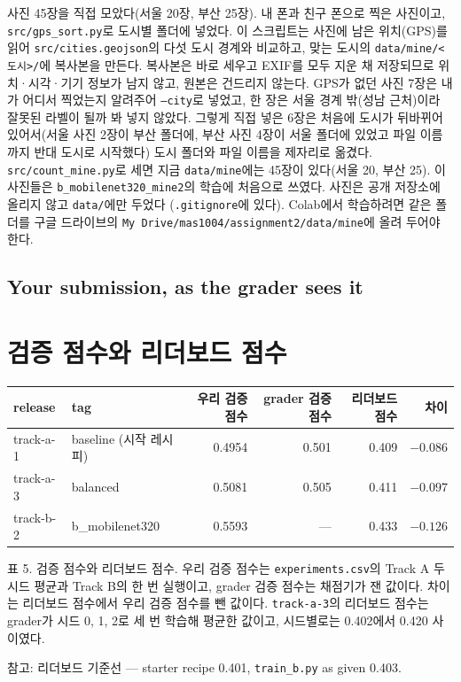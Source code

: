 \documentclass[11pt]{article}
\begin{document}
사진 45장을 직접 모았다(서울 20장, 부산 25장). 내 폰과 친구 폰으로 찍은 사진이고,
\texttt{src/gps\_sort.py}로 도시별 폴더에 넣었다. 이 스크립트는 사진에 남은 위치(GPS)를
읽어 \texttt{src/cities.geojson}의 다섯 도시 경계와 비교하고, 맞는 도시의
\texttt{data/mine/<도시>/}에 복사본을 만든다. 복사본은 바로 세우고 EXIF를 모두 지운 채
저장되므로 위치·시각·기기 정보가 남지 않고, 원본은 건드리지 않는다. GPS가 없던 사진
7장은 내가 어디서 찍었는지 알려주어 \texttt{--city}로 넣었고, 한 장은 서울 경계 밖(성남
근처)이라 잘못된 라벨이 될까 봐 넣지 않았다. 그렇게 직접 넣은 6장은 처음에 도시가
뒤바뀌어 있어서(서울 사진 2장이 부산 폴더에, 부산 사진 4장이 서울 폴더에 있었고 파일
이름까지 반대 도시로 시작했다) 도시 폴더와 파일 이름을 제자리로 옮겼다.
\texttt{src/count\_mine.py}로 세면 지금 \texttt{data/mine}에는 45장이 있다(서울 20, 부산 25).
이 사진들은 \texttt{b\_mobilenet320\_mine2}의 학습에 처음으로 쓰였다. 사진은 공개 저장소에
올리지 않고 \texttt{data/}에만 두었다
(\texttt{.gitignore}에 있다). Colab에서 학습하려면 같은 폴더를 구글 드라이브의
\texttt{My Drive/mas1004/assignment2/data/mine}에 올려 두어야 한다.

\subsection*{Your submission, as the grader sees it}

\section*{검증 점수와 리더보드 점수}

\begin{center}\footnotesize
\begin{tabular}{llrrrr}
\toprule
release & tag & 우리 검증 점수 & grader 검증 점수 & 리더보드 점수 & 차이 \\
\midrule
track-a-1 & baseline (시작 레시피) & 0.4954 & 0.501 & 0.409 & $-0.086$ \\
track-a-3 & balanced & 0.5081 & 0.505 & 0.411 & $-0.097$ \\
track-b-2 & b\_mobilenet320 & 0.5593 & --- & 0.433 & $-0.126$ \\
\bottomrule
\end{tabular}

{\footnotesize 표 5. 검증 점수와 리더보드 점수. 우리 검증 점수는 \texttt{experiments.csv}의 Track A 두 시드 평균과 Track B의 한 번 실행이고, grader 검증 점수는 채점기가 잰 값이다. 차이는 리더보드 점수에서 우리 검증 점수를 뺀 값이다. \texttt{track-a-3}의 리더보드 점수는 grader가 시드 0, 1, 2로 세 번 학습해 평균한 값이고, 시드별로는 0.402에서 0.420 사이였다.}

{\footnotesize 참고: 리더보드 기준선 --- starter recipe 0.401, \texttt{train\_b.py} as given 0.403.}
\end{center}
\end{document}
